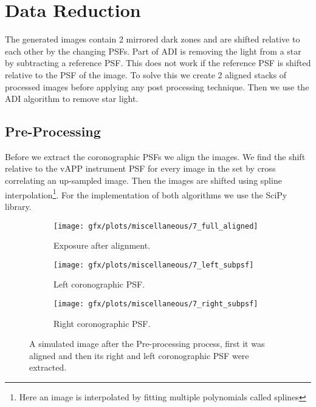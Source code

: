 
\chapter{Data Reduction} %
\label{ch:data_red} %
The generated images contain 2 mirrored dark zones and are shifted relative to each other by the changing \acp{PSF}. Part of \ac{ADI} is removing the light from a star by subtracting a reference \ac{PSF}. This does not work if the reference \ac{PSF} is shifted relative to the \ac{PSF} of the image. To solve this we create 2 aligned stacks of processed images before applying any post processing technique. Then we use the \ac{ADI} algorithm to remove star light.

\section{Pre-Processing}
Before we extract the coronographic \acp{PSF} we align the images. We find the shift relative to the \ac{vAPP} instrument \ac{PSF} for every image in the set by cross correlating an up-sampled image. Then the images are shifted using spline interpolation\footnote{Here an image is interpolated by fitting multiple polynomials called splines}. For the implementation of both algorithms we use the SciPy library\cite{scipy}.

\begin{figure}[h!]
  
      \begin{subfigure}[b]{0.5\textwidth}
        \texttt{[image: gfx/plots/miscellaneous/7\_full\_aligned]}
        \caption{Exposure after alignment.}
      \end{subfigure}%
      
      \begin{subfigure}[b]{0.5\textwidth}
        \texttt{[image: gfx/plots/miscellaneous/7\_left\_subpsf]}
        \caption{Left coronographic \ac{PSF}.}
        \label{fig:slice_a}
      \end{subfigure}      
      \begin{subfigure}[b]{0.5\textwidth}
        \texttt{[image: gfx/plots/miscellaneous/7\_right\_subpsf]}
        \caption{Right coronographic \ac{PSF}.}
        \label{fig:slice_b}
      \end{subfigure}%

  \caption{A simulated image after the Pre-processing process, first it was aligned and then its right and left coronographic \ac{PSF} were extracted.}
  \label{fig:psf_kernals}
\end{figure}

